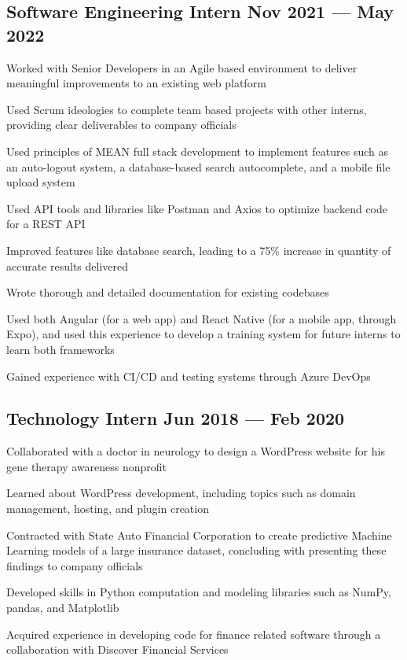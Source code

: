 \documentclass[letter,10pt]{article}
\begin{document}
\subsection{{Software Engineering Intern \hfill Nov 2021 --- May 2022}}
\begin{zitemize}
\item Worked with Senior Developers in an Agile based environment to deliver meaningful improvements to an existing web platform
\item Used Scrum ideologies to complete team based projects with other interns, providing clear deliverables to company officials
\item Used principles of MEAN full stack development to implement features such as an auto-logout system, a database-based search autocomplete, and a mobile file upload system
\item Used API tools and libraries like Postman and Axios to optimize backend code for a REST API
\item Improved features like database search, leading to a 75\% increase in quantity of accurate results delivered
\item Wrote thorough and detailed documentation for existing codebases
\item Used both Angular (for a web app) and React Native (for a mobile app, through Expo), and used this experience to develop a training system for future interns to learn both frameworks
\item Gained experience with CI/CD and testing systems through Azure DevOps
\end{zitemize}

\subsection{{Technology Intern \hfill Jun 2018 --- Feb 2020}}
\begin{zitemize}
\item Collaborated with a doctor in neurology to design a WordPress website for his gene therapy awareness nonprofit
\item Learned about WordPress development, including topics such as domain management, hosting, and plugin creation
\item Contracted with State Auto Financial Corporation to create predictive Machine Learning models of a large insurance dataset, concluding with presenting these findings to company officials
\item Developed skills in Python computation and modeling libraries such as NumPy, pandas, and Matplotlib
\item Acquired experience in developing code for finance related software through a collaboration with Discover Financial Services
\end{zitemize}
\end{document}
